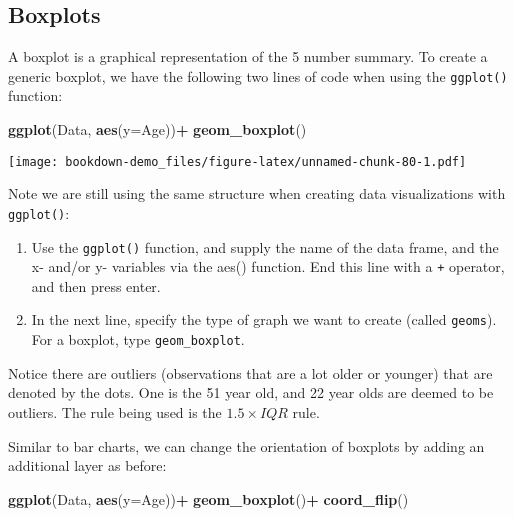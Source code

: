 \documentclass[
]{book}
\newenvironment{Shaded}{\begin{snugshade}}{\end{snugshade}}
\newcommand{\AttributeTok}[1]{\textcolor[rgb]{0.13,0.29,0.53}{#1}}
\newcommand{\FunctionTok}[1]{\textcolor[rgb]{0.13,0.29,0.53}{\textbf{#1}}}
\newcommand{\NormalTok}[1]{#1}
\newcommand{\SpecialCharTok}[1]{\textcolor[rgb]{0.81,0.36,0.00}{\textbf{#1}}}
\begin{document}
\hypertarget{boxplots}{%
\subsection{Boxplots}\label{boxplots}}

A boxplot is a graphical representation of the 5 number summary. To create a generic boxplot, we have the following two lines of code when using the \texttt{ggplot()} function:

\begin{Shaded}
\begin{Highlighting}[]
\FunctionTok{ggplot}\NormalTok{(Data, }\FunctionTok{aes}\NormalTok{(}\AttributeTok{y=}\NormalTok{Age))}\SpecialCharTok{+}
  \FunctionTok{geom\_boxplot}\NormalTok{()}
\end{Highlighting}
\end{Shaded}

\texttt{[image: bookdown-demo\_files/figure-latex/unnamed-chunk-80-1.pdf]}

Note we are still using the same structure when creating data visualizations with \texttt{ggplot()}:

\begin{enumerate}
\def\labelenumi{\arabic{enumi}.}
\item
  Use the \texttt{ggplot()} function, and supply the name of the data frame, and the x- and/or y- variables via the aes() function. End this line with a \texttt{+} operator, and then press enter.
\item
  In the next line, specify the type of graph we want to create (called \texttt{geoms}). For a boxplot, type \texttt{geom\_boxplot}.
\end{enumerate}

Notice there are outliers (observations that are a lot older or younger) that are denoted by the dots. One is the 51 year old, and 22 year olds are deemed to be outliers. The rule being used is the \(1.5 \times IQR\) rule.

Similar to bar charts, we can change the orientation of boxplots by adding an additional layer as before:

\begin{Shaded}
\begin{Highlighting}[]
\FunctionTok{ggplot}\NormalTok{(Data, }\FunctionTok{aes}\NormalTok{(}\AttributeTok{y=}\NormalTok{Age))}\SpecialCharTok{+}
  \FunctionTok{geom\_boxplot}\NormalTok{()}\SpecialCharTok{+}
  \FunctionTok{coord\_flip}\NormalTok{()}
\end{Highlighting}
\end{Shaded}
\end{document}

